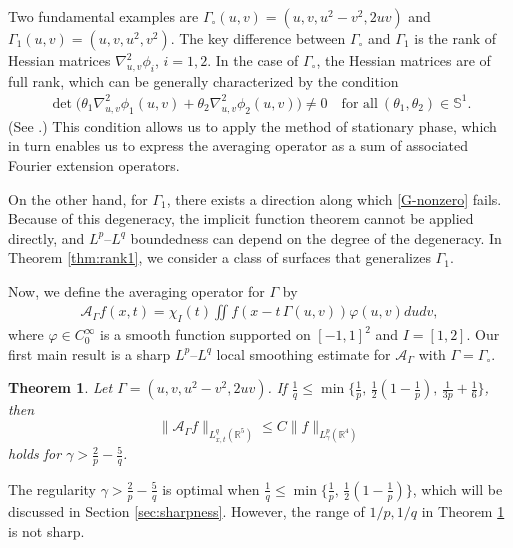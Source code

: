 \documentclass[10pt] %
{amsart}
\theoremstyle{plain}
\newtheorem{thm}{Theorem}[section]
\numberwithin{equation}{section}
\begin{document}
Two fundamental examples are $\Gamma_\circ (u,v) = (u,v,u^2-v^2, 2uv)$ and $\Gamma_1 (u,v) = (u,v,u^2,v^2)$.
The key difference between $\Gamma_\circ$ and $\Gamma_1$ is the rank of Hessian matrices $\nabla_{u,v}^2 \phi_i$, $i=1,2$. 
In the case of $\Gamma_\circ$, the Hessian matrices are of full rank, which can be generally characterized by the condition 
\begin{align}\label{G-nonzero}
\det \big( \theta_1 \nabla_{u,v}^2 \phi_1(u,v) + \theta_2 \nabla_{u,v}^2 \phi_2(u,v) \big  ) \neq0
\quad \text{for all} ~  (\theta_1, \theta_2) \in \mathbb S^1.
\end{align}
(See \cite{Ch82, Ch85, Mo96, Ba02}.)
This condition allows us to apply the method of stationary phase, which in turn enables us to express the averaging operator as a sum of associated Fourier extension operators.

On the other hand, for $\Gamma_1$, there exists a direction along which \eqref{G-nonzero} fails. 
Because of this degeneracy, the implicit function theorem cannot be applied directly, and $L^p$--$L^q$ boundedness can depend on the degree of the degeneracy. 
In Theorem \ref{thm:rank1}, we consider a class of surfaces that generalizes $\Gamma_1$. 

\bigskip

Now, we define the averaging operator for $\Gamma$ by
\begin{align*}
\mathcal A_\Gamma f(x,  t) = \chi_I (t) \iint f(x -  t \,\Gamma (u, v) ) \varphi(u,v)du dv ,
\end{align*}
where  
$\varphi\in C_0^\infty$ is a smooth function supported on $[-1,1]^2$ and $I = [1,2]$. 
Our first main result is a sharp $L^p$--$L^q$ local smoothing estimate for $\mathcal A_\Gamma$ with $\Gamma=\Gamma_\circ$. 

\begin{thm}\label{LS}
Let $\Gamma = (u,v, u^2-v^2, 2uv)$.  
If $\frac 1 q \le \min\{ \frac 1p,\, \frac12(1-\frac1p),\,  \frac 1{3p}+\frac16 \}$,
then 
\begin{equation}\label{est-LS}
\|\mathcal A_\Gamma f \| _{L^q_{x,t}(\mathbb R^5)} \le C \|f \|_{L^p_\gamma (\mathbb R^4)}
\end{equation}
holds for $\gamma > \frac 2p -\frac 5 q$. 
\end{thm}

The regularity $\gamma > \frac 2p -\frac 5 q$ is optimal when $\frac 1 q \le \min\{ \frac 1p,\, \frac12(1-\frac1p)\}$, which will be discussed in Section \ref{sec:sharpness}.
However, the range of $1/p,1/q$ in Theorem \ref{LS} is not sharp. 
\end{document}
